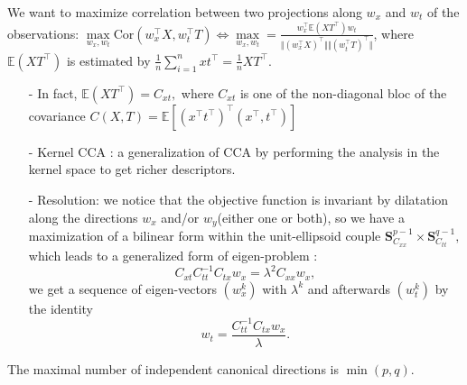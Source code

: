 \documentclass[12pt]{report}	%
\def\ts{\top}
\begin{document}
We want to maximize correlation between two projections along $w_x$ and $w_t$ of the observations: $\max\limits_{w_x,w_t} \text{Cor}(w_x^{\ts}X, w_t^{\ts}T) \Leftrightarrow \max\limits_{w_x,w_t}= \frac{w_x^{\ts}\mathbb{E}(X T^{\ts})w_t}{\Vert (w_x^{\ts}X)^{\ts} \Vert \Vert (w_t^{\ts}T)^{\ts} \Vert }$, where $\mathbb{E}(X T^{\ts})$ is estimated by $\frac{1}{n}\sum_{i=1}^n xt^{\ts} = \frac{1}{n}XT^{\ts}$.
\begin{itemize}
\item[-] In fact, $\mathbb{E}(XT^{\ts}) = C_{xt},$ where $C_{xt}$ is one of the non-diagonal bloc of the covariance $C(X,T) = \mathbb{E}[ (x^{\ts} t^{\ts})^{\ts}(x^{\ts}, t^{\ts})] $
\item[-] Kernel CCA : a generalization of CCA by performing the analysis in the kernel space to get richer descriptors.

\item[-] Resolution: we notice that the objective function is invariant by dilatation along the directions $w_x$ and/or $w_y$(either one or both), so we have a maximization of a bilinear form within the unit-ellipsoid couple $\bm{S}_{C_{xx}}^{p-1}\times \bm{S}_{C_{tt}}^{q-1},$ which leads to a generalized form of eigen-problem : \begin{equation}
 C_{xt}C_{tt}^{-1}C_{tx}w_x = \lambda^2 C_{xx}w_x,
 \label{eq.eig1}
\end{equation} we get a sequence of eigen-vectors $(w_x^{k})$ with $\lambda^k$ and afterwards  $(w_t^{k})$ by the identity $$w_t = \frac{C_{tt}^{-1}C_{tx}w_x}{\lambda}.$$


\end{itemize} 
The maximal number of independent canonical directions is $\min(p,q)$.
\end{document}
